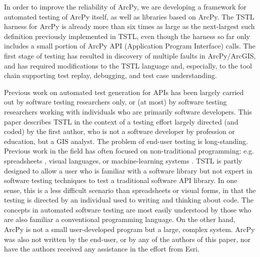 In order to improve the reliability of ArcPy, we are developing a
framework for automated testing of ArcPy itself, as well as libraries
based on ArcPy.  The TSTL harness for ArcPy is already more than six times as
large as the next-largest such definition previously implemented in
TSTL, even though the harness so far only includes a small portion of ArcPy
API (Application Program Interface) calls. The first stage of testing has resulted in discovery of
multiple faults in ArcPy/ArcGIS, and has required modifications to the
TSTL language and, especially, to the tool chain supporting test replay,
debugging, and test case understanding.




Previous work on automated test generation for APIs has been largely carried
out by software testing researchers only, or (at most) by software
testing researchers working with individuals who are primarily
software developers.  This paper describes TSTL in the context of a
testing effort largely directed (and coded) by the first author, who is not a
software developer by profession or education, but a GIS analyst.
The problem of end-user testing
\cite{burnettEUSE,Silos,rothermelTOSEM} is long-standing.  Previous
work in the field has often focused on
non-traditional programming: e.g. spreadsheets
\cite{rothermelTOSEM}, visual languages, or machine-learning systems
\cite{OnlyOracle}.  TSTL is partly designed to allow a user who is
familiar with a software library but not expert in software testing
techniques to test a traditional software API library.  In one sense,
this is a less difficult scenario than spreadsheets
or visual forms, in that the testing is directed by an individual used
to writing and thinking about code.  The concepts in
automated software testing are most easily understood by those
who are also familiar a conventional
programming language.  On the other hand, ArcPy is
not a small user-developed program but a large, complex system.
ArcPy was also not written by the end-user, or by any of the authors
of this paper, nor have the authors received any assistance in the
effort from Esri.

